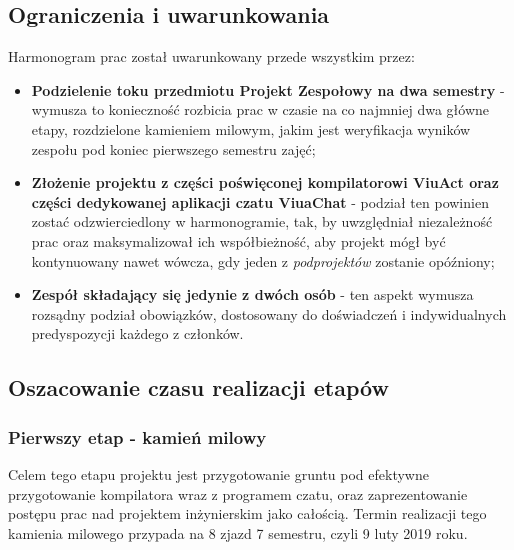\documentclass[11pt,oneside,a4paper,titlepage,onecolumn]{article}
\begin{document}
\subsection{Ograniczenia i uwarunkowania}
Harmonogram prac został uwarunkowany przede wszystkim przez:
\begin{itemize}
	\item \textbf{Podzielenie toku przedmiotu Projekt Zespołowy na dwa semestry} - wymusza to konieczność rozbicia prac w czasie na co najmniej dwa główne etapy, rozdzielone kamieniem milowym, jakim jest weryfikacja wyników zespołu pod koniec pierwszego semestru zajęć;
	\item \textbf{Złożenie projektu z części poświęconej kompilatorowi ViuAct oraz części dedykowanej aplikacji czatu ViuaChat} - podział ten powinien zostać odzwierciedlony w harmonogramie, tak, by uwzględniał niezależność prac oraz maksymalizował ich współbieżność, aby projekt mógł być kontynuowany nawet wówcza, gdy jeden z \textit{podprojektów} zostanie opóźniony;
	\item \textbf{Zespół składający się jedynie z dwóch osób} - ten aspekt wymusza rozsądny podział obowiązków, dostosowany do doświadczeń i indywidualnych predyspozycji każdego z członków.
\end{itemize}

\subsection{Oszacowanie czasu realizacji etapów}

\subsubsection{Pierwszy etap - kamień milowy}
Celem tego etapu projektu jest przygotowanie gruntu pod efektywne przygotowanie kompilatora wraz z programem
czatu, oraz zaprezentowanie postępu prac nad projektem inżynierskim jako całością. Termin realizacji
tego kamienia milowego przypada na 8 zjazd 7 semestru, czyli 9 luty 2019 roku.
\end{document}
